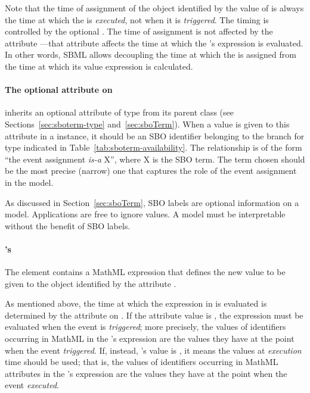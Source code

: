 Note that the time of assignment of the object identified by the
value of  is always the time at which the \Event
is \emph{executed}, not when it is \emph{triggered}.  The timing
is controlled by the optional \Delay.  The time of assignment is
not affected by the \Event attribute
---that attribute affects the time
at which the \EventAssignment's  expression is
evaluated.  In other words, SBML allows decoupling the time at
which the  is assigned from the time at which its
value expression is calculated.


\paragraph{The optional  attribute on }
\label{sec:eventassignment-sboterm}

\EventAssignment inherits an optional 
attribute of type  from its parent
class \SBase (see Sections~\ref{sec:sboterm-type}
and~\ref{sec:sboTerm}).  When a value is given to this
attribute in a  \EventAssignment  instance, it should be an
SBO identifier belonging to the branch for type  \EventAssignment 
indicated in Table~\ref{tab:sboterm-availability}.  The relationship is
of the form ``the event assignment \emph{is-a} X'', where X is
the SBO term.  The term chosen should be the most precise (narrow)
one that captures the role of the event assignment  in the model.

As discussed in Section~\ref{sec:sboTerm}, SBO labels are optional
information on a model.  Applications are free to ignore
 values.  A model must be interpretable without the
benefit of SBO labels.


\paragraph{'s }

The  element contains a MathML expression that defines
the new value to be given to the object identified by the
\EventAssignment attribute .

As mentioned above, the time at which the expression in
 is evaluated is determined by the attribute
 on \Event.  If the attribute
value is , the expression must be evaluated when the
event is \emph{triggered}; more precisely, the values of identifiers
occurring in MathML   in the
\EventAssignment's  expression are the values they
have at the point when the event \emph{triggered}.  If, instead,
's value is , it means
the values at \emph{execution} time should be used; that is, the
values of identifiers occurring in MathML  attributes in
the \EventAssignment's  expression are the values they
have at the point when the event \emph{executed}.


